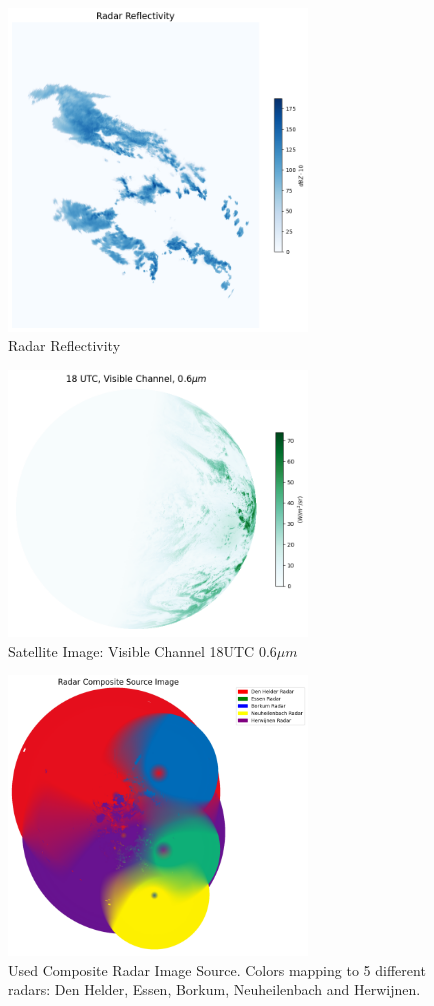 \documentclass[acmtog, screen, balance]{acmart}
\begin{document}
\begin{figure}[hbp]
  \centering
  \includegraphics[width=225pt]{./images/radar_reflectivity.png}
  \caption{Radar Reflectivity}
  \Description{}
  \label{fig:reflect}
\end{figure}

\begin{figure}[hbp]
  \centering
  \includegraphics[width=225pt]{./images/vis_006.png}
  \caption{Satellite Image: Visible Channel 18UTC $0.6\mu m$}
  \Description{}
  \label{fig:vis}
\end{figure}

\begin{figure}[hbp]
  \centering
  \includegraphics[width=225pt]{./images/radar_source.png}
  \caption{Used Composite Radar Image Source. Colors mapping to 5 different radars: Den Helder, Essen, Borkum, Neuheilenbach and Herwijnen.}
  \Description{}
  \label{fig:radsource}
\end{figure}
\end{document}
